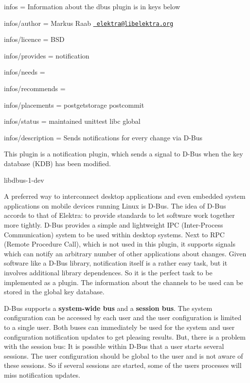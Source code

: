 
\begin{DoxyItemize}
\item infos = Information about the dbus plugin is in keys below
\item infos/author = Markus Raab \href{mailto:elektra@libelektra.org}{\texttt{ elektra@libelektra.\+org}}
\item infos/licence = B\+SD
\item infos/provides = notification
\item infos/needs =
\item infos/recommends =
\item infos/placements = postgetstorage postcommit
\item infos/status = maintained unittest libc global
\item infos/description = Sends notifications for every change via D-\/\+Bus
\end{DoxyItemize}

This plugin is a notification plugin, which sends a signal to D-\/\+Bus when the key database (K\+DB) has been modified.


\begin{DoxyItemize}
\item {\ttfamily libdbus-\/1-\/dev}
\end{DoxyItemize}

A preferred way to interconnect desktop applications and even embedded system applications on mobile devices running Linux is D-\/\+Bus. The idea of D-\/\+Bus accords to that of Elektra\+: to provide standards to let software work together more tightly. D-\/\+Bus provides a simple and lightweight I\+PC (Inter-\/\+Process Communication) system to be used within desktop systems. Next to R\+PC (Remote Procedure Call), which is not used in this plugin, it supports signals which can notify an arbitrary number of other applications about changes. Given software like a D-\/\+Bus library, notification itself is a rather easy task, but it involves additional library dependences. So it is the perfect task to be implemented as a plugin. The information about the channels to be used can be stored in the global key database.

D-\/\+Bus supports a {\bfseries{system-\/wide bus}} and a {\bfseries{session bus}}. The system configuration can be accessed by each user and the user configuration is limited to a single user. Both buses can immediately be used for the system and user configuration notification updates to get pleasing results. But, there is a problem with the session bus\+: It is possible within D-\/\+Bus that a user starts several sessions. The user configuration should be global to the user and is not aware of these sessions. So if several sessions are started, some of the user\textquotesingle{}s processes will miss notification updates.

